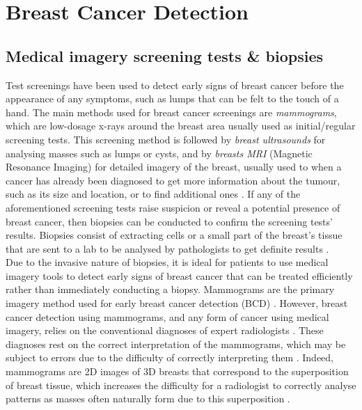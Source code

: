 
\section{Breast Cancer Detection}

\subsection{Medical imagery screening tests \& biopsies}
\label{sec:litreview-bcd-medical-imagery}

Test screenings have been used to detect early signs of breast cancer before the appearance of any symptoms, such as lumps that can be felt to the touch of a hand. The main methods used for breast cancer screenings are \textit{mammograms}, which are low-dosage x-rays around the breast area usually  used as initial/regular screening tests. This screening method is followed by \textit{breast ultrasounds} for analysing masses such as lumps or cysts, and by \textit{breasts MRI} (Magnetic Resonance Imaging) for detailed imagery of the breast, usually used to when a cancer has already been diagnosed to get more information about the tumour, such as its size and location, or to find additional ones \citep{americanCancerSociety2019}. If any of the aforementioned screening tests raise suspicion or reveal a potential presence of breast cancer, then biopsies can be conducted to confirm the screening tests' results. Biopsies consist of extracting cells or a small part of the breast's tissue that are sent to a lab to be analysed by pathologists to get definite results \citep{martin2019}.\\

Due to the invasive nature of biopsies, it is ideal for patients to use medical imagery tools to detect early signs of breast cancer that can be treated efficiently rather than immediately conducting a biopsy. Mammograms are the primary imagery method used for early breast cancer detection (BCD) \citep{Ramos-Pollan2012}. However, breast cancer detection using mammograms, and any form of cancer using medical imagery, relies on the conventional diagnoses of expert radiologists \citep{Osareh2010}. These diagnoses rest on the correct interpretation of the mammograms, which may be subject to errors due to the difficulty of correctly interpreting them \citep{Elter2009}. Indeed, mammograms are 2D images of 3D breasts that correspond to the superposition of breast tissue, which increases the difficulty for a radiologist to correctly analyse patterns as masses often naturally form due to this superposition \citep{Elter2009}.

